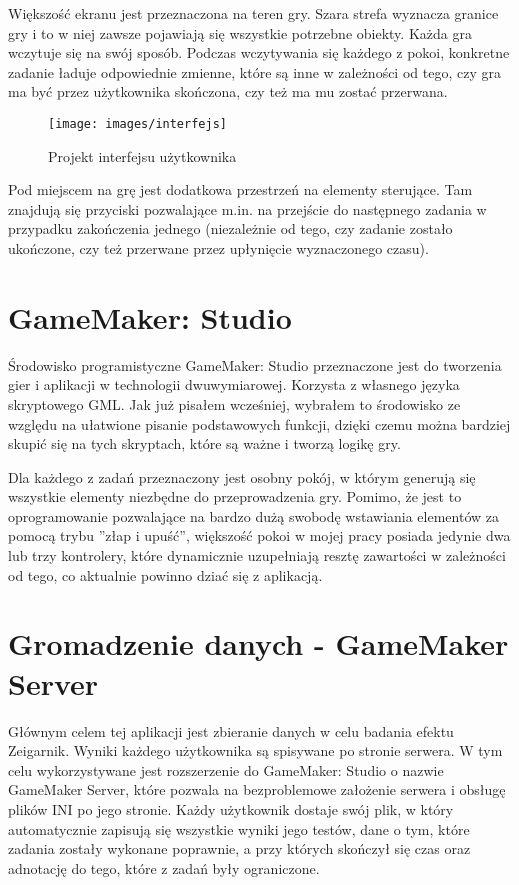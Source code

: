 \documentclass[openright]{xmgr}
\begin{document}
Większość ekranu jest przeznaczona na teren gry. Szara strefa wyznacza
granice gry i to w niej zawsze pojawiają się wszystkie potrzebne obiekty.
Każda gra wczytuje się na swój sposób. Podczas wczytywania się każdego z pokoi,
konkretne zadanie ładuje odpowiednie zmienne, które są inne w zależności od tego, czy gra ma być przez użytkownika skończona, czy też ma mu zostać przerwana.

\begin{figure}[H]
\centering
\texttt{[image: images/interfejs]}
\caption{Projekt interfejsu użytkownika}
\label{fig:obrazek k}
\end{figure}

Pod miejscem na grę jest dodatkowa przestrzeń na elementy sterujące. Tam znajdują się przyciski pozwalające m.in. na przejście do następnego zadania w przypadku zakończenia jednego (niezależnie od tego, czy zadanie zostało ukończone, czy też przerwane przez upłynięcie wyznaczonego czasu).

\section{GameMaker: Studio}
Środowisko programistyczne GameMaker: Studio przeznaczone jest do tworzenia
gier i aplikacji w technologii dwuwymiarowej. Korzysta z własnego
języka skryptowego GML. Jak już pisałem wcześniej, wybrałem to środowisko
ze względu na ułatwione pisanie podstawowych funkcji, dzięki
czemu można bardziej skupić się na tych skryptach, które są ważne i
tworzą logikę gry.

Dla każdego z zadań przeznaczony jest osobny pokój, w którym generują
się wszystkie elementy niezbędne do przeprowadzenia gry. Pomimo, że jest to
oprogramowanie pozwalające na bardzo dużą swobodę wstawiania elementów
za pomocą trybu ”złap i upuść”, większość pokoi w mojej pracy posiada
jedynie dwa lub trzy kontrolery, które dynamicznie uzupełniają resztę zawartości w zależności od tego, co aktualnie powinno dziać się z aplikacją.

\section{Gromadzenie danych - GameMaker Server}
Głównym celem tej aplikacji jest zbieranie danych w celu badania efektu
Zeigarnik. Wyniki każdego użytkownika są spisywane po stronie serwera. W
tym celu wykorzystywane jest rozszerzenie do GameMaker: Studio o nazwie
GameMaker Server, które pozwala na bezproblemowe założenie serwera i
obsługę plików INI po jego stronie. Każdy użytkownik dostaje swój plik,
w który automatycznie zapisują się wszystkie wyniki jego testów, dane o tym, które zadania zostały wykonane poprawnie, a przy których skończył się czas oraz adnotację do tego, które z zadań były ograniczone.
\end{document}
